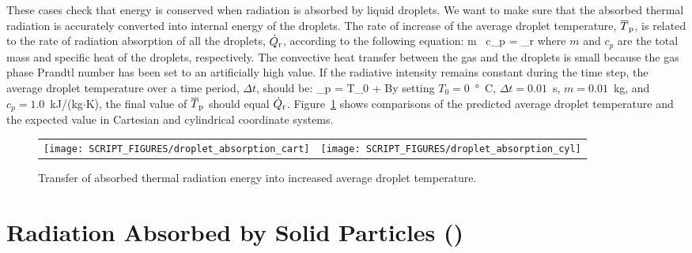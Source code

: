 \documentclass[11pt]{book}
\begin{document}
These cases check that energy is conserved when radiation is absorbed by liquid droplets. We want to make sure that the absorbed thermal radiation is accurately converted into internal energy of the droplets. The rate of increase of the average droplet temperature, $\overline{T}_{\rm p}$, is related to the rate of radiation absorption of all the droplets, $\dot{Q}_{\rm r}$, according to the following equation:
\be
m \, c_p  = _{\rm r}
\ee
where $m$ and $c_p$ are the total mass and specific heat of the droplets, respectively. The convective heat transfer between the gas and the droplets is small because the gas phase Prandtl number has been set to an artificially high value. If the radiative intensity remains constant during the time step, the average droplet temperature over a time period, $\Delta t$, should be:
\be
{}_{\rm p} = T_0 + 
\ee
By setting $T_0=0$~\si{\degree C}, $\Delta t =0.01$~s, $m =0.01$~kg, and $c_p =1.0$~kJ/(kg$\cdot$K), the final value of $\overline{T}_{\rm p}$ should equal $\dot{Q}_{\rm r}$. Figure~\ref{droplet_absorption_figures} shows comparisons of the predicted average droplet temperature and the expected value in Cartesian and cylindrical coordinate systems.

\begin{figure}[ht]
\noindent
\begin{tabular*}{\textwidth}{l@{\extracolsep{\fill}}r}
\texttt{[image: SCRIPT\_FIGURES/droplet\_absorption\_cart]} &
\texttt{[image: SCRIPT\_FIGURES/droplet\_absorption\_cyl]}
\end{tabular*}
\caption[Radiation absorption by liquid droplets]{Transfer of absorbed thermal radiation energy into increased average droplet temperature.}
\label{droplet_absorption_figures}
\end{figure}



\section{Radiation Absorbed by Solid Particles (\texorpdfstring{}{particle\_absorption}) }
\label{particle_absorption}
\label{particle_absorption_cart_surf_cart}
\label{particle_absorption_cart_surf_cyl}
\label{particle_absorption_cart_surf_sph}
\end{document}
